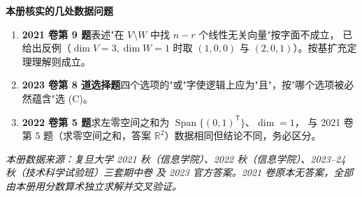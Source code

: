 \documentclass[10pt]{ctexart}
\newcommand{\Rr}{\mathbb{R}}
\newcommand{\Span}{\operatorname{Span}}
\newcommand{\TT}{^{\mathsf T}}
\begin{document}
\vspace{0.4cm}
\begin{warnbox}
\textbf{本册核实的几处数据问题}\quad
\begin{enumerate}
\item \textbf{2021 卷第 9 题}表述"在 $V\setminus W$ 中找 $n-r$ 个线性无关向量"按字面不成立，
已给出反例（$\dim V=3,\dim W=1$ 时取 $(1,0,0)$ 与 $(2,0,1)$）。按基扩充定理理解则成立。
\item \textbf{2023 卷第 8 道选择题}四个选项的"或"字使逻辑上应为"且"，按"哪个选项被必然蕴含"选 (C)。
\item \textbf{2022 卷第 5 题}求左零空间之和为 $\Span\{(0,1)\TT\}$、$\dim=1$，
与 2021 卷第 5 题（求零空间之和，答案 $\Rr^2$）数据相同但结论不同，务必区分。
\end{enumerate}
\end{warnbox}

\vspace{0.2cm}
{\small\textit{本册数据来源：复旦大学 2021 秋（信息学院）、2022 秋（信息学院）、2023--24 秋（技术科学试验班）三套期中卷
及 2023 官方答案。2021 卷原本无答案，全部由本册用分数算术独立求解并交叉验证。}}
\end{document}
